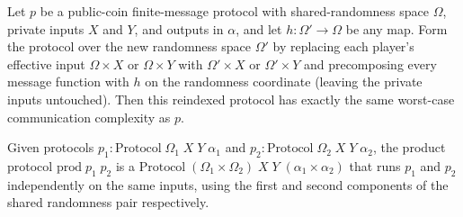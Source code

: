 \begin{theorem}
\label{CommunicationComplexity.PublicCoin.FiniteMessage.Protocol.comapRandomness_complexity}
\leanok
{}
Let $p$ be a public-coin finite-message protocol with shared-randomness space $\Omega$,
private inputs $X$ and $Y$, and outputs in $\alpha$, and let $h : \Omega' \to \Omega$ be
any map. Form the protocol over the new randomness space $\Omega'$ by replacing each
player's effective input $\Omega \times X$ or $\Omega \times Y$ with $\Omega' \times X$
or $\Omega' \times Y$ and precomposing every message function with $h$ on the randomness
coordinate (leaving the private inputs untouched). Then this reindexed protocol has
exactly the same worst-case communication complexity as $p$.
\end{theorem}

\begin{definition}
\label{CommunicationComplexity.PublicCoin.FiniteMessage.Protocol.prod}
\leanok
{}
Given protocols $p_1 : \mathrm{Protocol}\;\Omega_1\;X\;Y\;\alpha_1$ and
$p_2 : \mathrm{Protocol}\;\Omega_2\;X\;Y\;\alpha_2$, the product protocol
$\mathrm{prod}\;p_1\;p_2$ is a $\mathrm{Protocol}\;(\Omega_1 \times \Omega_2)\;X\;Y\;(\alpha_1 \times \alpha_2)$
that runs $p_1$ and $p_2$ independently on the same inputs, using the first and second
components of the shared randomness pair respectively.
\end{definition}

